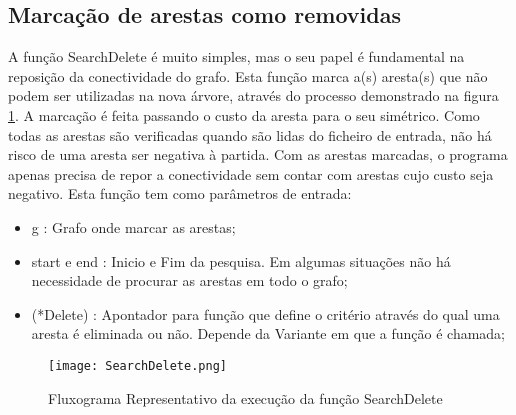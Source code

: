 \documentclass[14pt]{article}
\begin{document}
    \subsection[SearchDelete]{Marcação de arestas como removidas}\label{subsec:SearchDelete} 
    A função SearchDelete é muito simples, mas o seu papel é fundamental na reposição da conectividade do grafo.
    Esta função marca a(s) aresta(s) que não podem ser utilizadas na nova árvore, através do processo demonstrado na figura \ref{fig:SearchDelete}.
    A marcação é feita passando o custo da aresta para o seu simétrico.
    Como todas as arestas são verificadas quando são lidas do ficheiro de entrada, não há risco de uma aresta ser negativa à partida.
    Com as arestas marcadas, o programa apenas precisa de repor a conectividade sem contar com arestas cujo custo seja negativo.
    Esta função tem como parâmetros de entrada:
    \begin{itemize}
        \item g : Grafo onde marcar as arestas;
        \item start e end : Inicio e Fim da pesquisa. Em algumas situações não há necessidade de procurar as arestas em todo o grafo;
        \item (*Delete) : Apontador para função que define o critério através do qual uma aresta é eliminada ou não. Depende da Variante em que a função é chamada;
    \end{itemize}
    \begin{figure}[H]
        \centering
        \label{fig:SearchDelete}
        \texttt{[image: SearchDelete.png]}
        \caption { Fluxograma Representativo da execução da função SearchDelete }
    \end{figure}
\end{document}
